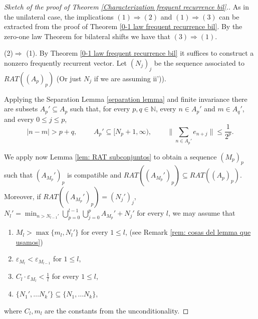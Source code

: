 \documentclass[11pt]{amsart}
\newcommand{\zN}{\mathbb N}
\newcommand{\sub}{\subseteq}
\begin{document}
\begin{proof}[Sketch of the proof of Theorem \ref{Characterization frequent recurrence bil}.]
As in the unilateral case, the implications $(1)\Rightarrow (2)$ and $(1)\Rightarrow (3)$ can be extracted from the proof of  Theorem \ref{0-1 law frequent recurrence bil}. By the zero-one law Theorem for bilateral shifts we have that $(3)\Rightarrow (1).$

(2)$\Rightarrow$ (1).  
 By Theorem \ref{0-1 law frequent recurrence bil} it suffices to construct a nonzero frequently recurrent vector.
Let $(N_j)_j$ be the sequence associated to $RAT((A_p)_p)$ (Or just $N_j$ if we are assuming ii')). 
 
 Applying the Separation Lemma \ref{separation lemma} and finite invariance there are subsets $A_p'\subseteq A_p$ such  that,  for every $p,q\in\zN$, every $n\in A_p'$ and $m\in A_q'$, and every $0\leq j\leq p$, 
\begin{equation}\label{separation property characterization bil}
|n-m|>p+q,\qquad \text{
 $A_p'\subseteq [N_p+1,\infty)$, }\qquad \|\sum_{n\in A_p'} e_{n+j}\|\leq \frac{1}{2^p}.    
\end{equation}


We apply now Lemma \ref{lem: RAT subconjuntos} to obtain a sequence $(M_p)_p$ such that $(A_{M_p}')_p$ is compatible and $RAT((A_{M_p}')_p)\sub RAT((A_p)_p)$.
 Moreover, if $RAT((A_{M_p}')_p)=(N_j')_j$, $N_{l}'=\min_{n>N_{l-1}'} \bigcup_{p=0}^{l-1} \bigcup_{j=0}^p A_{M_p}'+N_j'$ for every $l$, we may assume that 
\begin{enumerate}
   \item[a)] $M_{l}>\max\{m_{l},N_l'\}$ for every $1\leq l$, (see Remark \ref{rem: cosas del lemma que usamos})  %
   \item [b)] $\varepsilon_{M_l}<\varepsilon_{M_{l-1}}$ for $1\leq l$, 
    \item [c)] $C_l\cdot\varepsilon_{M_l}<\frac{1}{l}$ for every $1\leq l$,
    \item [d)] $\{N_1',\ldots N_k'\}\subseteq \{N_1,\ldots N_k\}$,
\end{enumerate}
where $C_l,m_l$ are the constants from the unconditionality.


\end{proof}
\end{document}
